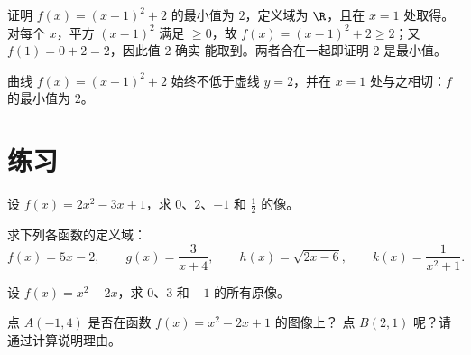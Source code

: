 \begin{example}\label{ex:g10:functions:extremum}
证明 $f(x) = (x - 1)^2 + 2$ 的最小值为 $2$，定义域为 $\R$，且在
$x = 1$ 处取得。对每个 $x$，平方 $(x-1)^2$ 满足 $\geq 0$，故
$f(x) = (x-1)^2 + 2 \geq 2$；又 $f(1) = 0 + 2 = 2$，因此值 $2$ 确实
能取到。两者合在一起即证明 $2$ 是最小值。
\end{example}

\begin{omfigure}

{\small 曲线 $f(x) = (x-1)^2 + 2$ 始终不低于虚线
$y = 2$，并在 $x = 1$ 处与之相切：$f$ 的最小值为 $2$。}
\end{omfigure}

\section{练习}

\begin{exercise}[$\star$]\label{exo:g10:functions:1}
设 $f(x) = 2x^2 - 3x + 1$，求 $0$、$2$、$-1$ 和
$\frac12$ 的像。
\end{exercise}

\begin{exercise}[$\star$]\label{exo:g10:functions:2}
求下列各函数的定义域：
\[
f(x) = 5x - 2, \qquad
g(x) = \frac{3}{x + 4}, \qquad
h(x) = \sqrt{2x - 6}, \qquad
k(x) = \frac{1}{x^2 + 1}.
\]
\end{exercise}

\begin{exercise}[$\star$]\label{exo:g10:functions:3}
设 $f(x) = x^2 - 2x$，求 $0$、$3$ 和 $-1$ 的所有原像。
\end{exercise}

\begin{exercise}[$\star$]\label{exo:g10:functions:4}
点 $A(-1, 4)$ 是否在函数 $f(x) = x^2 - 2x + 1$ 的图像上？
点 $B(2, 1)$ 呢？请通过计算说明理由。
\end{exercise}

